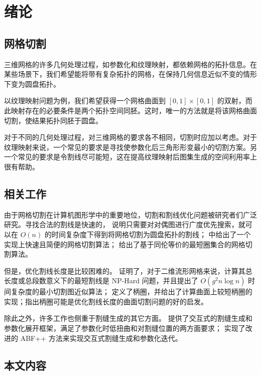 
\chapter{绪论}

\section{网格切割}

三维网格的许多几何处理过程，如参数化和纹理映射，都依赖网格的拓扑信息。在某些场景下，我们希望能将带有复杂拓扑的网格，在保持几何信息近似不变的情形下变为圆盘拓扑。

以纹理映射问题为例，我们希望获得一个网格曲面到 $ [0, 1] \times [0, 1] $ 的双射，而此映射存在的必要条件是两个拓扑空间同胚。这时，唯一的方法就是将该网格曲面切割，使结果拓扑同胚于圆盘。

对于不同的几何处理过程，对三维网格的要求各不相同，切割时应加以考虑。对于纹理映射来说，一个常见的要求是寻找使参数化后三角形形变最小的切割方案\cite{Gu2002}。另一个常见的要求是令割线尽可能短，这在提高纹理映射后图集生成的空间利用率上很有帮助\cite{atlasgen}。

\section{相关工作}

由于网格切割在计算机图形学中的重要地位，切割和割线优化问题被研究者们广泛研究。寻找合法的割线是快速的，\citet{Dey1995} 说明只需要对对偶图进行广度优先搜索，就可以在 $ O(n) $ 的时间复杂度下得到将网格切割为圆盘拓扑的割线；\citet{Gu2002} 中给出了一个实现上快速且简便的网格切割算法；\citet{DeVerdiere2005} 给出了基于同伦等价的最短圈集合的网格切割算法。

但是，优化割线长度是比较困难的。\citet{Erickson2002} 证明了，对于二维流形网格来说，计算其总长度或总段数意义下的最短割线是 NP-Hard 问题，并且提出了 $ O(g^2 n \log n) $ 时间复杂度的最小切割图近似算法；\citet{oncomputinghantun} 定义了柄圈，并给出了计算曲面上较短柄圈的实现\cite{Dey2013}\cite{Dey2008}；\citet{Chai2018}指出柄圈可能是优化割线长度的曲面切割问题的好的启发。

除此之外，许多工作也侧重于割缝生成的其它方面。\citet{Poranne2017} 提供了交互式的割缝生成和参数化展开框架，满足了参数化时低扭曲和对割缝位置的两方面要求；\citet{wysiwyg} 实现了改进的 ABF++ 方法来实现交互式割缝生成和参数化迭代。

\section{本文内容}

